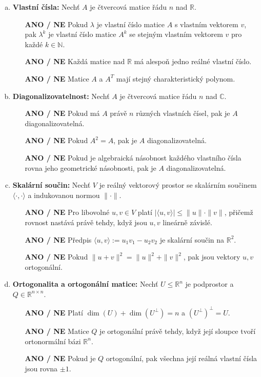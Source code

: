 \documentclass[a4paper,11pt]{article}
\begin{document}
\begin{enumerate}[(a)]
    \item \textbf{Vlastní čísla:} Nechť $A$ je čtvercová matice řádu $n$ nad $\mathbb{R}$.
    \begin{itemize}
        \item[\textbf{ANO / NE}] Pokud $\lambda$ je vlastní číslo matice $A$ s vlastním vektorem $v$, pak $\lambda^k$ je vlastní číslo matice $A^k$ se stejným vlastním vektorem $v$ pro každé $k \in \mathbb{N}$.
        \item[\textbf{ANO / NE}] Každá matice nad $\mathbb{R}$ má alespoň jedno reálné vlastní číslo.
        \item[\textbf{ANO / NE}] Matice $A$ a $A^T$ mají stejný charakteristický polynom.
    \end{itemize}

    \item \textbf{Diagonalizovatelnost:} Nechť $A$ je čtvercová matice řádu $n$ nad $\mathbb{C}$.
    \begin{itemize}
        \item[\textbf{ANO / NE}] Pokud má $A$ právě $n$ různých vlastních čísel, pak je $A$ diagonalizovatelná.
        \item[\textbf{ANO / NE}] Pokud $A^2 = A$, pak je $A$ diagonalizovatelná.
        \item[\textbf{ANO / NE}] Pokud je algebraická násobnost každého vlastního čísla rovna jeho geometrické násobnosti, pak je $A$ diagonalizovatelná.
    \end{itemize}

    \item \textbf{Skalární součin:} Nechť $V$ je reálný vektorový prostor se skalárním součinem $\langle \cdot, \cdot \rangle$ a indukovanou normou $\|\cdot\|$.
    \begin{itemize}
        \item[\textbf{ANO / NE}] Pro libovolné $u, v \in V$ platí $|\langle u, v \rangle| \leq \|u\| \cdot \|v\|$, přičemž rovnost nastává právě tehdy, když jsou $u, v$ lineárně závislé.
        \item[\textbf{ANO / NE}] Předpis $\langle u, v \rangle := u_1 v_1 - u_2 v_2$ je skalární součin na $\mathbb{R}^2$.
        \item[\textbf{ANO / NE}] Pokud $\|u+v\|^2 = \|u\|^2 + \|v\|^2$, pak jsou vektory $u, v$ ortogonální.
    \end{itemize}

    \item \textbf{Ortogonalita a ortogonální matice:} Nechť $U \leq \mathbb{R}^n$ je podprostor a $Q \in \mathbb{R}^{n \times n}$.
    \begin{itemize}
        \item[\textbf{ANO / NE}] Platí $\dim(U) + \dim(U^\perp) = n$ a $(U^\perp)^\perp = U$.
        \item[\textbf{ANO / NE}] Matice $Q$ je ortogonální právě tehdy, když její sloupce tvoří ortonormální bázi $\mathbb{R}^n$.
        \item[\textbf{ANO / NE}] Pokud je $Q$ ortogonální, pak všechna její reálná vlastní čísla jsou rovna $\pm 1$.
    \end{itemize}
\end{enumerate}
\end{document}
